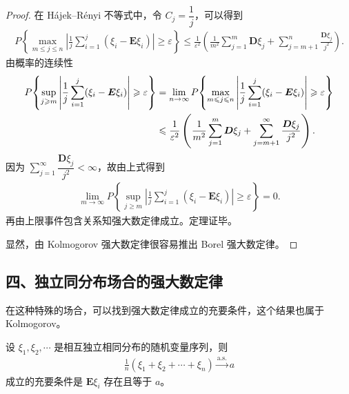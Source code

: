 \documentclass[../../main.tex]{subfiles}
\begin{document}
\begin{proof}
在 Hájek--Rényi 不等式中，令 $C_j=\dfrac1j$，可以得到
\begin{align*}
P\!\left\{\max_{m\leqslant j\leqslant n}\left|\frac1j\sum_{i=1}^{j}(\xi_i-\boldsymbol{E}\xi_i)\right|\geqslant\varepsilon\right\}
\leqslant\frac{1}{\varepsilon^{2}}\left(\frac{1}{m^{2}}\sum_{j=1}^{m}\boldsymbol{D}\xi_j+\sum_{j=m+1}^{n}\frac{\boldsymbol{D}\xi_j}{j^{2}}\right).
\end{align*}
由概率的连续性
\begin{align}
P\!\left\{\sup_{j\geqslant m}\left|\frac1j\sum_{i=1}^{j}(\xi_i-\boldsymbol{E}\xi_i)\right|\geqslant\varepsilon\right\}
&=\lim_{n\to\infty}P\!\left\{\max_{m\leqslant j\leqslant n}\left|\frac1j\sum_{i=1}^{j}(\xi_i-\boldsymbol{E}\xi_i)\right|\geqslant\varepsilon\right\}\notag\\
&\leqslant\frac{1}{\varepsilon^{2}}\left(\frac{1}{m^{2}}\sum_{j=1}^{m}\boldsymbol{D}\xi_j+\sum_{j=m+1}^{\infty}\frac{\boldsymbol{D}\xi_j}{j^{2}}\right).
\end{align}
因为 $\sum_{j=1}^{\infty}\dfrac{\boldsymbol{D}\xi_j}{j^{2}}<\infty$，故由上式得到
\begin{align*}
\lim_{m\to\infty}P\!\left\{\sup_{j\geqslant m}\left|\frac1j\sum_{i=1}^{j}(\xi_i-\boldsymbol{E}\xi_i)\right|\geqslant\varepsilon\right\}=0.
\end{align*}
再由上限事件包含关系知强大数定律成立。定理证毕。

显然，由 Kolmogorov 强大数定律很容易推出 Borel 强大数定律。
\end{proof}

\subsection*{四、独立同分布场合的强大数定律}

在这种特殊的场合，可以找到强大数定律成立的充要条件，这个结果也属于 Kolmogorov。

\begin{theorem}[Kolmogorov]\label{theorem:ch05-独立同分布强大数定律}
设 $\xi_1,\xi_2,\cdots$ 是相互独立相同分布的随机变量序列，则
\begin{align}
\frac1n(\xi_1+\xi_2+\cdots+\xi_n)\xrightarrow{\mathrm{a.s.}}a
\end{align}
成立的充要条件是 $\boldsymbol{E}\xi_i$ 存在且等于 $a$。
\end{theorem}
\end{document}
